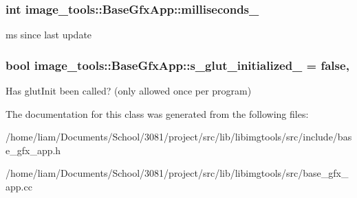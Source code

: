 \subsubsection[{\texorpdfstring{milliseconds\+\_\+}{milliseconds_}}]{\setlength{\rightskip}{0pt plus 5cm}int image\+\_\+tools\+::\+Base\+Gfx\+App\+::milliseconds\+\_\+\hspace{0.3cm}{\ttfamily [private]}}\hypertarget{classimage__tools_1_1BaseGfxApp_a2197d887035883be911d1ced510d99d9}{}\label{classimage__tools_1_1BaseGfxApp_a2197d887035883be911d1ced510d99d9}
ms since last update 
\subsubsection[{\texorpdfstring{s\+\_\+glut\+\_\+initialized\+\_\+}{s_glut_initialized_}}]{\setlength{\rightskip}{0pt plus 5cm}bool image\+\_\+tools\+::\+Base\+Gfx\+App\+::s\+\_\+glut\+\_\+initialized\+\_\+ = false\hspace{0.3cm}{\ttfamily [static]}, {\ttfamily [private]}}\hypertarget{classimage__tools_1_1BaseGfxApp_a4bfe294b3c2987edd8e8465e4047a064}{}\label{classimage__tools_1_1BaseGfxApp_a4bfe294b3c2987edd8e8465e4047a064}
Has glut\+Init been called? (only allowed once per program) 

The documentation for this class was generated from the following files\+:\begin{DoxyCompactItemize}
\item 
/home/liam/\+Documents/\+School/3081/project/src/lib/libimgtools/src/include/base\+\_\+gfx\+\_\+app.\+h\item 
/home/liam/\+Documents/\+School/3081/project/src/lib/libimgtools/src/base\+\_\+gfx\+\_\+app.\+cc\end{DoxyCompactItemize}
